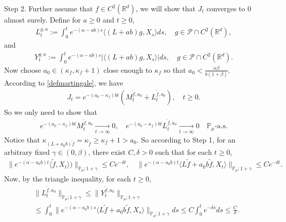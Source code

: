 \documentclass[12pt,a4paper]{amsart}
\theoremstyle{plain}
\theoremstyle{definition}
\numberwithin{equation}{section}
\begin{document}
	Step 2.
	Further assume that $f\in C^2(\mathbb R^d)$, we will show that $J_t$ converges to $0$ almost surely.
	Define for $a \geq 0$ and $ t\geq 0$,
\begin{equation}\begin{split}
	L_t^{g,a}:=\int_0^t e^{-(\alpha-ab)s}\langle (L+ab)g,X_s\rangle ds,
	\quad g\in \mathcal P\cap C^2(\mathbb R^d),
\end{split}\end{equation}
and
\begin{equation}\begin{split}
    Y_t^{g,a}
    :=\int_0^t e^{-(\alpha-ab)s}|\langle (L+ab)g,X_s\rangle|ds,
    \quad g\in \mathcal P\cap C^2(\mathbb R^d).
\end{split}\end{equation}
	Now choose $a_0 \in (\kappa_{f}, \kappa_f + 1)$ close enough to $\kappa_f$ so that $a_0 < \frac{\alpha \beta}{b(1+\beta)}$.
	According to \eqref{defmartingale}, we have
\begin{align*}
    J_t
    =e^{-(a_0-\kappa_f)bt} (M_t^{\tilde{f}, a_0}+L_t^{\tilde{f}, a_0}),
    \quad t\geq 0.
\end{align*}
	So we only need to show that
\begin{align*}
    e^{-(a_0-\kappa_f)b t}M_t^{\tilde{f},a_0}
    \xrightarrow[t\to \infty]{} 0,
    \quad e^{-(a_0-\kappa_f)b t}L_t^{\tilde{f},a_0}
    \xrightarrow[t\to \infty]{} 0
    \quad \mathbb{P}_{\mu}\text{-a.s.}
\end{align*}
	Notice that $\kappa_{(L+a_0 b)\tilde{f}}=\kappa_{\tilde{f}}\geq \kappa_f+1 > a_0$.
	So according to Step 1, for an arbitrary fixed $\gamma\in (0,\beta)$, there exist $C, \delta>0$ such that for each $t\geq 0$,
\begin{equation}\begin{split}
    \|e^{-(\alpha-a_0 b)t}\langle \tilde{f},X_t\rangle)\|_{\mathbb{P}_{\mu};1+\gamma}
    \leq C e^{-\delta t},
    \quad \|e^{-(\alpha-a_0 b)t}\langle L\tilde{f}+a_0 b\tilde{f},X_t\rangle\|_{\mathbb{P}_{\mu};1+\gamma}
    \leq C e^{-\delta t}.
\end{split}\end{equation}
	Now, by the triangle inequality, for each $t\geq 0$,
\begin{align*}
    &\|L_t^{\tilde{f},a_0}\|_{\mathbb{P}_{\mu};1+\gamma}
    \leq\|Y_t^{\tilde{f},a_0}\|_{\mathbb{P}_{\mu};1+\gamma}
    \\&\leq \int_0^t \|e^{-(\alpha-a_0 b)s}\langle L\tilde{f}+a_0 b\tilde{f},X_s\rangle\|_{\mathbb{P}_{\mu};1+\gamma}ds\leq C \int_0^t e^{-\delta s}ds\leq\frac{C}{\delta}.
\end{align*}
\end{document}
